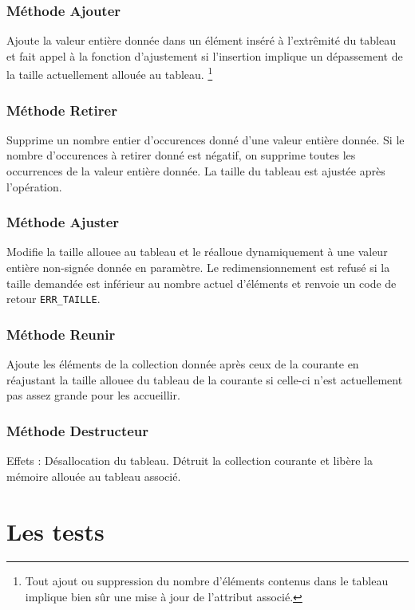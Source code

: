 \documentclass[11pt]{article}
\begin{document}
\subsubsection*{Méthode Ajouter}
Ajoute la valeur entière donnée dans un élément inséré à l'extrêmité du tableau et fait appel à la fonction d'ajustement si l'insertion implique un dépassement de la taille actuellement allouée au tableau.
\footnote{Tout ajout ou suppression du nombre d'éléments contenus dans le tableau implique bien sûr une mise à jour de l'attribut associé.}

\subsubsection*{Méthode Retirer}
Supprime un nombre entier d'occurences donné d'une valeur entière donnée. Si le nombre d'occurences à retirer donné est négatif, on supprime toutes les occurrences de la valeur entière donnée. La taille du tableau est ajustée après l'opération. 

\subsubsection*{Méthode Ajuster}
Modifie la taille allouee au tableau et le réalloue dynamiquement à une valeur entière non-signée donnée en paramètre. Le redimensionnement est refusé si la taille demandée est inférieur au nombre actuel d'éléments et renvoie un code de retour \texttt{ERR\_TAILLE}.
    
\subsubsection*{Méthode Reunir}
Ajoute les éléments de la collection donnée après ceux de la courante en réajustant la taille allouee du tableau de la courante si celle-ci n'est actuellement pas assez grande pour les accueillir.

\subsubsection*{Méthode Destructeur}

\noindent Effets : Désallocation du tableau.
Détruit la collection courante et libère la mémoire allouée au tableau associé.
\newpage


\section{Les tests}
\end{document}
